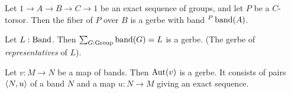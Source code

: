 \begin{definition}
  Let $1\to A\to B\to C\to 1$ be an exact sequence of groups, and let
  $P$ be a $C$-torsor. Then the fiber of $P$ over $B$ is a gerbe with
  band ${}^P\operatorname{band}(A)$.
\end{definition}

\begin{definition}
  Let $L : \mathord{\mathrm{Band}}$. Then $\sum_{G:\mathord{\mathrm{Group}}}\operatorname{band}(G)=L$ is a gerbe. (The
  gerbe of \emph{representatives} of $L$).
\end{definition}

\begin{definition} %
  Let $v : M \to N$ be a map of bands. Then $\operatorname{Aut}(v)$ is a gerbe. It
  consists of pairs $\langle N,u\rangle$ of a band $N$ and a map $u:N\to M$
  giving an exact sequence.
\end{definition}
